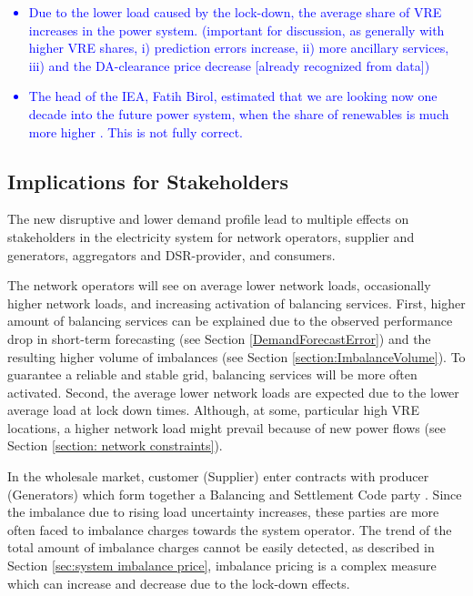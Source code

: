\documentclass[energies,article,submit,moreauthors,pdftex]{Definitions/mdpi}
\begin{document}
\textcolor{blue}{
\begin{itemize}
    \item Due to the lower load caused by the lock-down, the average share of VRE increases in the power system. (important for discussion, as generally with higher VRE shares, i) prediction errors increase, ii) more ancillary services, iii) and the DA-clearance price decrease [already recognized from data])
\end{itemize}
}

\textcolor{blue}{
\begin{itemize}
    \item The head of the IEA, Fatih Birol, estimated that we are looking now one decade into the future power system, when the share of renewables is much more higher \cite{IgorTodorovic2020Birol:Balance}. This is not fully correct.
\end{itemize}
}

\subsection{Implications for Stakeholders}

The new disruptive and lower demand profile lead to multiple effects on stakeholders in the electricity system for network operators, supplier and generators, aggregators and DSR-provider, and consumers. 

The network operators will see on average lower network loads, occasionally higher network loads, and increasing activation of balancing services. First, higher amount of balancing services can be explained due to the observed performance drop in short-term forecasting (see Section \ref{DemandForecastError}) and the resulting higher volume of imbalances (see Section \ref{section:ImbalanceVolume}). To guarantee a reliable and stable grid, balancing services will be more often activated. Second, the average lower network loads are expected due to the lower average load at lock down times. Although, at some, particular high VRE locations, a higher network load might prevail because of new power flows (see Section \ref{section: network constraints}).

In the wholesale market, customer (Supplier) enter contracts with producer (Generators) which form together a Balancing and Settlement Code party \cite{ELEXON2019GuidanceBritain}. Since the imbalance due to rising load uncertainty increases, these parties are more often faced to imbalance charges towards the system operator. The trend of the total amount of imbalance charges cannot be easily detected, as described in Section \ref{sec:system imbalance price}, imbalance pricing is a complex measure which can increase and decrease due to the lock-down effects. 
\end{document}
